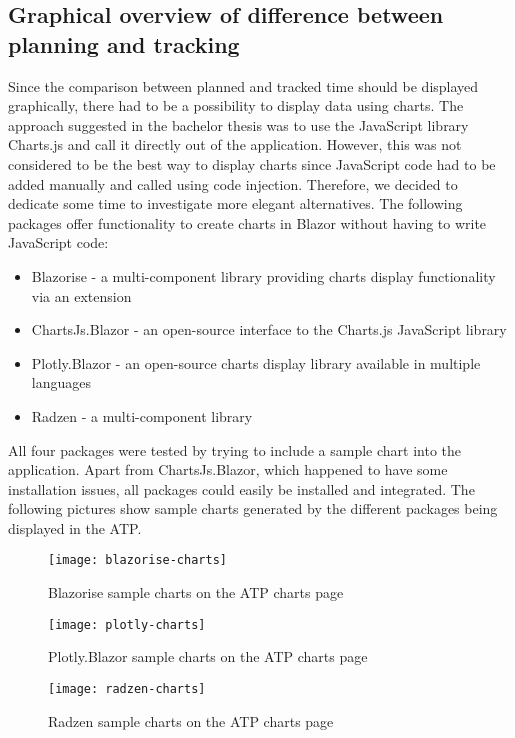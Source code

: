\subsection{Graphical overview of difference between planning and tracking} \label{Charts}
Since the comparison between planned and tracked time should be displayed graphically, there had to be a possibility to display data using charts. The approach suggested in the bachelor thesis was to use the JavaScript library Charts.js and call it directly out of the application. However, this was not considered to be the best way to display charts since JavaScript code had to be added manually and called using code injection. Therefore, we decided to dedicate some time to investigate more elegant alternatives. The following packages offer functionality to create charts in Blazor without having to write JavaScript code:
\begin{itemize}
	\item Blazorise \cite{blazorise-url} - a multi-component library providing charts display functionality via an extension
	\item ChartsJs.Blazor \cite{chartsjs.blazor-url} - an open-source interface to the Charts.js JavaScript library
	\item Plotly.Blazor \cite{plotly-url} - an open-source charts display library available in multiple languages
	\item Radzen \cite{radzen-url} - a multi-component library
\end{itemize}
All four packages were tested by trying to include a sample chart into the application. Apart from ChartsJs.Blazor, which happened to have some installation issues, all packages could easily be installed and integrated. The following pictures show sample charts generated by the different packages being displayed in the ATP.

\begin{figure}[H]
	\centering
	\texttt{[image: blazorise-charts]}
	\caption{Blazorise sample charts on the ATP charts page}
	\label{figure5}
\end{figure}

\begin{figure}[H]
	\centering
	\texttt{[image: plotly-charts]}
	\caption{Plotly.Blazor sample charts on the ATP charts page}
	\label{figure6}
\end{figure}

\begin{figure}[H]
	\centering
	\texttt{[image: radzen-charts]}
	\caption{Radzen sample charts on the ATP charts page}
	\label{figure7}
\end{figure}

